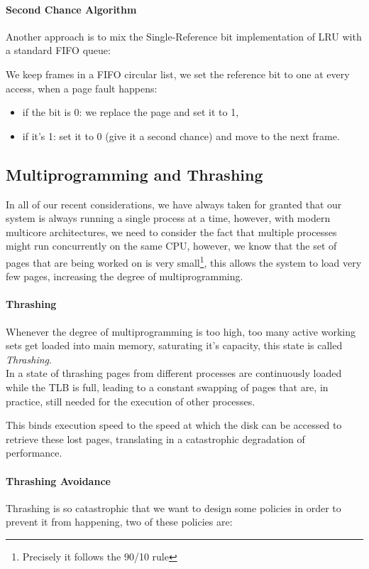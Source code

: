 \documentclass[openright, twoside]{report}
\theoremstyle{definition}
\theoremstyle{example}
\begin{document}
\paragraph{Second Chance Algorithm}
Another approach is to mix the Single-Reference bit implementation of LRU with a standard 
FIFO queue:

We keep frames in a FIFO circular list, we set the reference bit to one at every access, when a page 
fault happens:

\begin{itemize}
	\item if the bit is 0: we replace the page and set it to 1,
	\item if it's 1: set it to 0 (give it a second chance) and move to the next frame.
\end{itemize}

\subsection{Multiprogramming and Thrashing}
In all of our recent considerations, we have always taken for granted that 
our system is always running a single process at a time, however, with modern multicore 
architectures, we need to consider the fact that multiple processes might run concurrently on the same 
CPU, however, we know that the set of pages that are being worked on is very small\footnote{Precisely it follows the 
90/10 rule}, this allows the system to load very few pages, increasing the degree of multiprogramming.\\

\paragraph{Thrashing}
Whenever the degree of multiprogramming is too high, too many active working sets get 
loaded into main memory, saturating it's capacity, this state is called \emph{Thrashing}.\\ 

In a state of thrashing pages from different processes are continuously loaded while the 
TLB is full, leading to a constant swapping of pages that are, in practice, still needed
for the execution of other processes.

This binds execution speed to the speed at which the disk can be accessed to 
retrieve these lost pages, translating in a catastrophic degradation of performance.

\paragraph{Thrashing Avoidance}
Thrashing is so catastrophic that we want to design some policies in order to 
prevent it from happening, two of these policies are:
\end{document}
